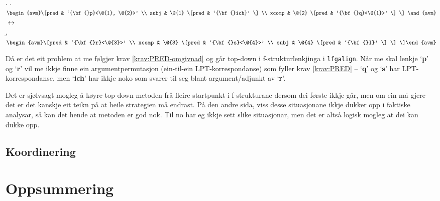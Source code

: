 \documentclass[11pt,a4paper,oneside,draft]{book}
\newcommand{\p}[1]{`\textbf{#1}'}
\begin{document}
{\avmoptions{}
\ex. \a. $\begin{avm}\[pred & `{\bf{}p}<\@{1}, \@{2}>'  \\
     subj & \@{1} \[pred &  `{\bf{}ich}' \] \\
     xcomp & \@{2} \[pred & `{\bf{}q}<\@{1}>' \] \] \end{avm}$
     $\\\\\leftrightarrow$\\
     \b. $\begin{avm}\[pred & `{\bf{}r}<\@{3}>' \\
     xcomp & \@{3} \[pred & `{\bf{}s}<\@{4}>' \\
     subj & \@{4} \[pred &  `{\bf{}I}' \] \] \]\end{avm}$

}

 Då er det eit problem at me følgjer krav \ref{krav:PRED-omgivnad} og
 går top-down i f-strukturlenkjinga i \texttt{lfgalign}. Når me skal lenkje
 \p{p} og \p{r} vil me ikkje finne ein argumentpermutasjon
 (ein-til-ein LPT-korrespondanse) som fyller krav \ref{krav:PRED} --
 \p{q} og \p{s} har LPT-korrespondanse, men \p{ich} har ikkje noko som
 svarer til seg blant argument/adjunkt av \p{r}.

 Det er sjølvsagt mogleg å køyre top-down-metoden frå fleire
 startpunkt i f-strukturane dersom dei første ikkje går, men om ein må
 gjere det er det kanskje eit teikn på at heile strategien må
 endrast. På den andre sida, viss desse situasjonane ikkje dukker opp
 i faktiske analysar, så kan det hende at metoden er god nok. Til no
 har eg ikkje sett slike situasjonar, men det er altså logisk mogleg
 at dei kan dukke opp.
\subsection{Koordinering}
\label{sec-5.5.2}

\section{Oppsummering}
\label{sec-5.6}
\end{document}
